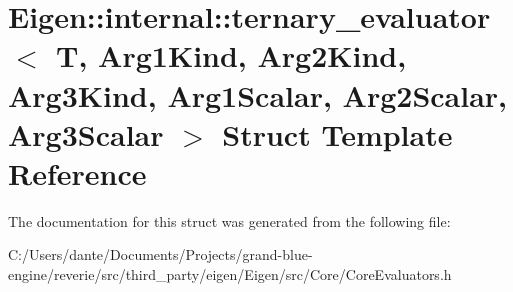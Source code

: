 \hypertarget{struct_eigen_1_1internal_1_1ternary__evaluator}{}\section{Eigen\+::internal\+::ternary\+\_\+evaluator$<$ T, Arg1\+Kind, Arg2\+Kind, Arg3\+Kind, Arg1\+Scalar, Arg2\+Scalar, Arg3\+Scalar $>$ Struct Template Reference}
\label{struct_eigen_1_1internal_1_1ternary__evaluator}


The documentation for this struct was generated from the following file\+:\begin{DoxyCompactItemize}
\item 
C\+:/\+Users/dante/\+Documents/\+Projects/grand-\/blue-\/engine/reverie/src/third\+\_\+party/eigen/\+Eigen/src/\+Core/Core\+Evaluators.\+h\end{DoxyCompactItemize}
